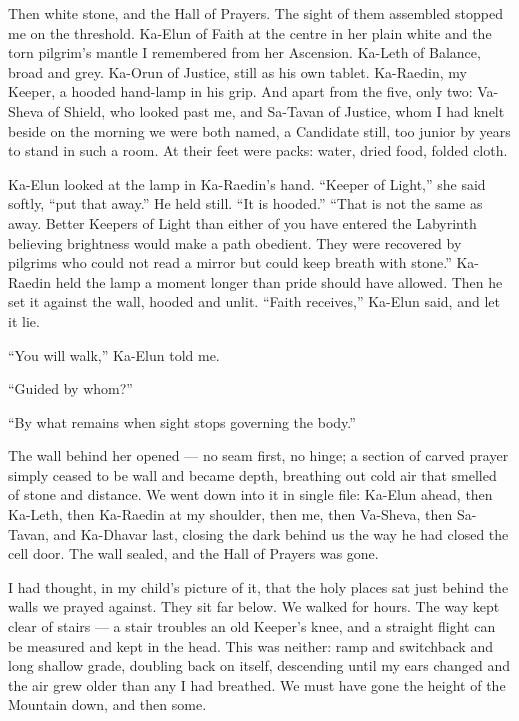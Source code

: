 Then white stone, and the Hall of Prayers. The sight of them assembled stopped me on the threshold. Ka-Elun of Faith at the centre in her plain white and the torn pilgrim's mantle I remembered from her Ascension. Ka-Leth of Balance, broad and grey. Ka-Orun of Justice, still as his own tablet. Ka-Raedin, my Keeper, a hooded hand-lamp in his grip. And apart from the five, only two: Va-Sheva of Shield, who looked past me, and Sa-Tavan of Justice, whom I had knelt beside on the morning we were both named, a Candidate still, too junior by years to stand in such a room. At their feet were packs: water, dried food, folded cloth.\par
 
Ka-Elun looked at the lamp in Ka-Raedin's hand. ``Keeper of Light,'' she said softly, ``put that away.'' He held still. ``It is hooded.'' ``That is not the same as away. Better Keepers of Light than either of you have entered the Labyrinth believing brightness would make a path obedient. They were recovered by pilgrims who could not read a mirror but could keep breath with stone.'' Ka-Raedin held the lamp a moment longer than pride should have allowed. Then he set it against the wall, hooded and unlit. ``Faith receives,'' Ka-Elun said, and let it lie.\par
 
``You will walk,'' Ka-Elun told me.\par
 
``Guided by whom?''\par
 
``By what remains when sight stops governing the body.''\par
 
The wall behind her opened --- no seam first, no hinge; a section of carved prayer simply ceased to be wall and became depth, breathing out cold air that smelled of stone and distance. We went down into it in single file: Ka-Elun ahead, then Ka-Leth, then Ka-Raedin at my shoulder, then me, then Va-Sheva, then Sa-Tavan, and Ka-Dhavar last, closing the dark behind us the way he had closed the cell door. The wall sealed, and the Hall of Prayers was gone.\par
 
I had thought, in my child's picture of it, that the holy places sat just behind the walls we prayed against. They sit far below. We walked for hours. The way kept clear of stairs --- a stair troubles an old Keeper's knee, and a straight flight can be measured and kept in the head. This was neither: ramp and switchback and long shallow grade, doubling back on itself, descending until my ears changed and the air grew older than any I had breathed. We must have gone the height of the Mountain down, and then some.\par
 

